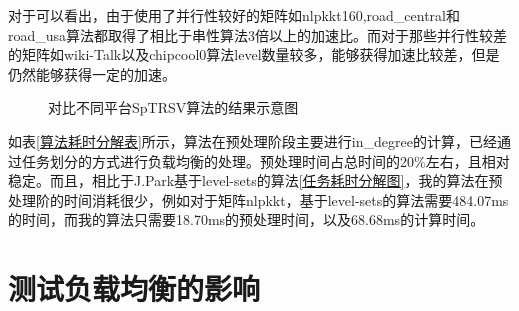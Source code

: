 对于可以看出，由于使用了并行性较好的矩阵如nlpkkt160,road\_central和road\_usa算法都取得了相比于串性算法3倍以上的加速比。而对于那些并行性较差的矩阵如wiki-Talk以及chipcool0算法level数量较多，能够获得加速比较差，但是仍然能够获得一定的加速。

\begin{figure}[htbp]
    \centering
    \quad
    \quad
    \quad
    \quad
    \quad
    \caption{对比不同平台SpTRSV算法的结果示意图}
    \label{SpTRSVMulti-paltform}
\end{figure}

\begin{table}[htbp]
    \caption{算法耗时分解表}
    \label{算法耗时分解表}
\end{table}

如表\ref{算法耗时分解表}所示，算法在预处理阶段主要进行in\_degree的计算，已经通过任务划分的方式进行负载均衡的处理。预处理时间占总时间的20\%左右，且相对稳定。而且，相比于J.Park\cite{park2014sparsifying}基于level-sets的算法\ref{任务耗时分解图}，我的算法在预处理阶的时间消耗很少，例如对于矩阵nlpkkt，基于level-sets的算法需要484.07ms的时间，而我的算法只需要18.70ms的预处理时间，以及68.68ms的计算时间。

\section{测试负载均衡的影响}

